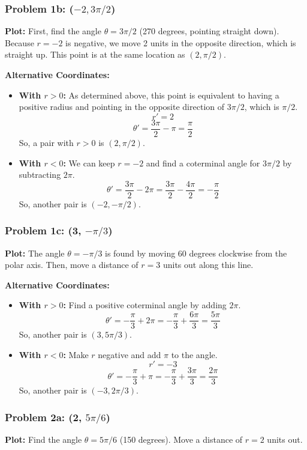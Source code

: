 \documentclass{article}
\begin{document}
\subsubsection*{Problem 1b: (\(-2, 3\pi/2\))}
\textbf{Plot:} First, find the angle \(\theta = 3\pi/2\) (270 degrees, pointing straight down). Because \(r=-2\) is negative, we move 2 units in the opposite direction, which is straight up. This point is at the same location as \((2, \pi/2)\).

\textbf{Alternative Coordinates:}
\begin{itemize}
    \item \textbf{With \(r > 0\):} As determined above, this point is equivalent to having a positive radius and pointing in the opposite direction of \(3\pi/2\), which is \(\pi/2\).
    \[ r' = 2 \]
    \[ \theta' = \frac{3\pi}{2} - \pi = \frac{\pi}{2} \]
    So, a pair with \(r>0\) is \((2, \pi/2)\).

    \item \textbf{With \(r < 0\):} We can keep \(r=-2\) and find a coterminal angle for \(3\pi/2\) by subtracting \(2\pi\).
    \[ \theta' = \frac{3\pi}{2} - 2\pi = \frac{3\pi}{2} - \frac{4\pi}{2} = -\frac{\pi}{2} \]
    So, another pair is \((-2, -\pi/2)\).
\end{itemize}

\subsubsection*{Problem 1c: (3, \(-\pi/3\))}
\textbf{Plot:} The angle \(\theta = -\pi/3\) is found by moving 60 degrees clockwise from the polar axis. Then, move a distance of \(r=3\) units out along this line.

\textbf{Alternative Coordinates:}
\begin{itemize}
    \item \textbf{With \(r > 0\):} Find a positive coterminal angle by adding \(2\pi\).
    \[ \theta' = -\frac{\pi}{3} + 2\pi = -\frac{\pi}{3} + \frac{6\pi}{3} = \frac{5\pi}{3} \]
    So, another pair is \((3, 5\pi/3)\).

    \item \textbf{With \(r < 0\):} Make \(r\) negative and add \(\pi\) to the angle.
    \[ r' = -3 \]
    \[ \theta' = -\frac{\pi}{3} + \pi = -\frac{\pi}{3} + \frac{3\pi}{3} = \frac{2\pi}{3} \]
    So, another pair is \((-3, 2\pi/3)\).
\end{itemize}

\subsubsection*{Problem 2a: (2, \(5\pi/6\))}
\textbf{Plot:} Find the angle \(\theta = 5\pi/6\) (150 degrees). Move a distance of \(r=2\) units out.
\end{document}
